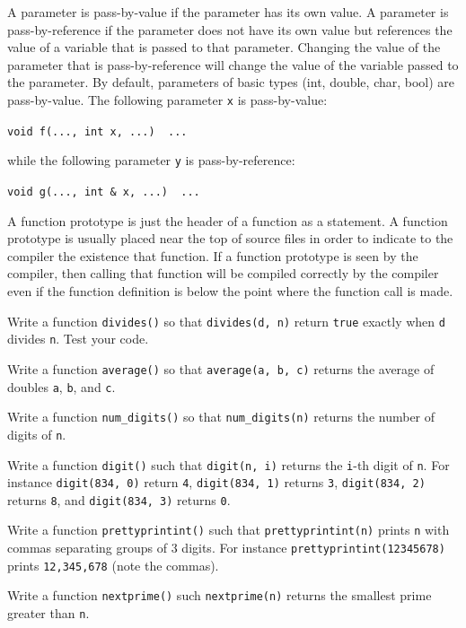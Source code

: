 A parameter is pass-by-value if the parameter has its own value. A parameter is pass-by-reference if the parameter does not have its own value but references the value of a variable that is passed to that parameter. Changing the value of the parameter that is pass-by-reference will change the value of the variable passed to the parameter. By default, parameters of basic types (int, double, char, bool) are pass-by-value. The following parameter \texttt{x} is pass-by-value:
\begin{center}
\texttt{void f(..., int x, ...) { ... }}
\end{center}
while the following parameter \texttt{y} is pass-by-reference:
\begin{center}
\texttt{void g(..., int \& x, ...) { ... }}
\end{center}
A function prototype is just the header of a function as a statement. A function prototype is usually placed near the top of source files in order to indicate to the compiler the existence that function. If a function prototype is seen by the compiler, then calling that function will be compiled correctly by the compiler even if the function definition is below the point where the function call is made.

\newpage{}

\begin{ex}
Write a function \texttt{divides()} so that \texttt{divides(d, n)} return \texttt{true} exactly when \texttt{d} divides \texttt{n}. Test your code.
\end{ex}

\begin{ex}
Write a function \texttt{average()} so that \texttt{average(a, b, c)} returns the average of doubles \texttt{a}, \texttt{b}, and \texttt{c}.
\end{ex}

\begin{ex}
Write a function \texttt{num\_digits()} so that \texttt{num\_digits(n)} returns the number of digits of \texttt{n}.
\end{ex}

\begin{ex}
Write a function \texttt{digit()} such that \texttt{digit(n, i)} returns the \texttt{i}-th digit of \texttt{n}. For instance \texttt{digit(834, 0)} return \texttt{4}, \texttt{digit(834, 1)} returns \texttt{3}, \texttt{digit(834, 2)} returns \texttt{8}, and \texttt{digit(834, 3)} returns \texttt{0}.
\end{ex}

\begin{ex}
Write a function \texttt{prettyprintint()} such that \texttt{prettyprintint(n)} prints \texttt{n} with commas separating groups of 3 digits. For instance \texttt{prettyprintint(12345678)} prints \texttt{12,345,678} (note the commas).
\end{ex}

\begin{ex}
Write a function \texttt{nextprime()} such \texttt{nextprime(n)} returns the smallest prime greater than \texttt{n}.
\end{ex}
